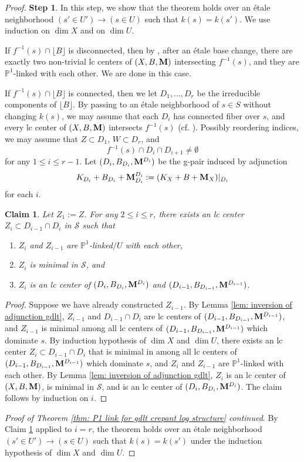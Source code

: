 \documentclass[11pt]{amsart}
\numberwithin{equation}{section}
\newcommand{\Mm}{{\bf{M}}}
\newtheorem{claim}[thm]{Claim}
\theoremstyle{definition}
\theoremstyle{definition}
\theoremstyle{definition}
\begin{document}
\begin{proof}
\noindent\textbf{Step 1}. In this step, we show that the theorem holds over an \'etale neighborhood $(s'\in U')\rightarrow (s\in U)$ such that $k(s)=k(s')$. We use induction on $\dim X$ and on $\dim U$.

If $f^{-1}(s)\cap\lfloor B\rfloor$ is disconnected, then by \cite[Theorem 3.5]{Bir20}, after an \'etale base change, there are exactly two non-trivial lc centers of $(X,B,\Mm)$ intersecting $f^{-1}(s)$, and they are $\mathbb P^1$-linked with each other. We are done in this case.

If $f^{-1}(s)\cap\lfloor B\rfloor$ is connected, then we let $D_1,\dots,D_r$ be the irreducible components of $\lfloor B\rfloor$.  By passing to an \'etale neighborhood of $s\in S$ without changing $k(s)$, we may assume that each $D_i$ has connected fiber over $s$, and every lc center of $(X,B,\Mm)$ intersects $f^{-1}(s)$ (cf. \cite[Claim 4.38.1]{Kol13}). Possibly reordering indices, we may assume that $Z\subset D_1$, $W\subset D_r$, and 
$$f^{-1}(s)\cap D_i\cap D_{i+1}\not=\emptyset$$
for any $1\leq i\leq r-1$. Let $(D_i,B_{D_i},\Mm^{D_i})$ be the g-pair induced by adjunction
$$K_{D_i}+B_{D_i}+\Mm^{D_i}_{D_i}:=(K_X+B+\Mm_X)|_{D_i}$$
for each $i$.
\begin{claim}\label{claim: p1link induction}
Let $Z_1:=Z$. For any $2\leq i\leq r$, there exists an lc center $Z_i\subset D_{i-1}\cap D_{i}$ in $\mathcal{S}$ such that
\begin{enumerate}
    \item $Z_i$ and $Z_{i-1}$ are $\mathbb P^1$-linked$/U$ with each other,
    \item $Z_i$ is minimal in $\mathcal{S}$, and
    \item $Z_i$ is an lc center of $(D_i,B_{D_i},\Mm^{D_i})$ and $(D_{i-1},B_{D_{i-1}},\Mm^{D_{i-1}})$.
\end{enumerate}
\end{claim}
\begin{proof}
Suppose we have already constructed $Z_{i-1}$. By Lemma \ref{lem: inversion of adjunction gdlt}, $Z_{i-1}$ and $D_{i-1}\cap D_i$ are lc centers of $(D_{i-1},B_{D_{i-1}},\Mm^{D_{i-1}})$, and $Z_{i-1}$ is minimal among all lc centers of $(D_{i-1},B_{D_{i-1}},\Mm^{D_{i-1}})$ which dominate $s$. By induction hypothesis of $\dim X$ and $\dim U$, there exists an lc center $Z_i\subset D_{i-1}\cap D_i$ that is minimal in among all lc centers of $(D_{i-1},B_{D_{i-1}},\Mm^{D_{i-1}})$ which dominate $s$, and $Z_i$ and $Z_{i-1}$ are $\mathbb P^1$-linked with each other. By Lemma \ref{lem: inversion of adjunction gdlt}, $Z_i$ is an lc center of $(X,B,\Mm)$, is minimal in $\mathcal{S}$, and is an lc center of $(D_i,B_{D_i},\Mm^{D_i})$. The claim follows by induction on $i$.
\end{proof}
\noindent\textit{Proof of Theorem \ref{thm: P1 link for gdlt crepant log structure} continued}. By Claim \ref{claim: p1link induction} applied to $i=r$, the theorem holds over an \'etale neighborhood $(s'\in U')\rightarrow (s\in U)$ such that $k(s)=k(s')$ under the induction hypothesis of $\dim X$ and $\dim U$.


\end{proof}
\end{document}
